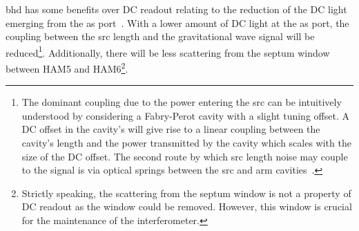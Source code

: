 \gls{bhd} has some benefits over DC readout relating to the reduction of the DC light emerging from the \gls{as} port~\cite{Fritschel2014}. With a lower amount of DC light at the \gls{as} port, the coupling between the \gls{src} length and the gravitational wave signal will be reduced\footnote{The dominant coupling due to the power entering the \gls{src} can be intuitively understood by considering a Fabry-Perot cavity with a slight tuning offset. A DC offset in the cavity's will give rise to a linear coupling between the cavity's length and the power transmitted by the cavity which scales with the size of the DC offset. The second route by which \gls{src} length noise may couple to the signal is via optical springs between the \gls{src} and arm cavities~\cite{Izumi2016}.}. Additionally, there will be less scattering from the septum window between HAM5 and HAM6\footnote{Strictly speaking, the scattering from the septum window is not a property of DC readout as the window could be removed. However, this window is crucial for the maintenance of the interferometer.}. %


